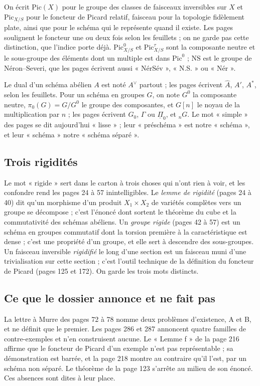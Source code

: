 \documentclass[11pt,a4paper]{article}
\begin{document}
On écrit $\mathrm{Pic}(X)$ pour le groupe des classes de faisceaux inversibles
sur $X$ et $\mathrm{Pic}_{X/S}$ pour le foncteur de Picard relatif, faisceau
pour la topologie fidèlement plate, ainsi que pour le schéma qui le représente
quand il existe. Les pages soulignent le foncteur une ou deux fois selon les
feuillets ; on ne garde pas cette distinction, que l'indice porte déjà.
$\mathrm{Pic}^0_{X/S}$ et $\mathrm{Pic}^\tau_{X/S}$ sont la composante neutre
et le sous-groupe des éléments dont un multiple est dans $\mathrm{Pic}^0$ ;
$\mathrm{NS}$ est le groupe de Néron--Severi, que les pages écrivent aussi
« NérSév », « N.S. » ou « Nér ».

Le dual d'un schéma abélien $A$ est noté $A^\vee$ partout ; les pages écrivent
$\hat{A}$, $A'$, $A^*$, selon les feuillets. Pour un schéma en groupes $G$, on
note $G^0$ la composante neutre, $\pi_0(G) = G/G^0$ le groupe des composantes,
et $G[n]$ le noyau de la multiplication par $n$ ; les pages écrivent $G_0$,
$\Gamma$ ou $\underline{\Pi}_0$, et ${}_nG$. Le mot « simple » des pages se dit
aujourd'hui « lisse » ; leur « préschéma » est notre « schéma », et leur
« schéma » notre « schéma séparé ».

\subsection*{Trois rigidités}

Le mot « rigide » sert dans le carton à trois choses qui n'ont rien à voir, et
les confondre rend les pages 24 à 57 inintelligibles. Le \emph{lemme de
rigidité} (pages 24 à 40) dit qu'un morphisme d'un produit $X_1 \times X_2$ de
variétés complètes vers un groupe se décompose ; c'est l'énoncé dont sortent le
théorème du cube et la commutativité des schémas abéliens. Un \emph{groupe
rigide} (pages 42 à 57) est un schéma en groupes commutatif dont la torsion
première à la caractéristique est dense ; c'est une propriété d'un groupe, et
elle sert à descendre des sous-groupes. Un faisceau inversible
\emph{rigidifié} le long d'une section est un faisceau muni d'une
trivialisation sur cette section ; c'est l'outil technique de la définition du
foncteur de Picard (pages 125 et 172). On garde les trois mots distincts.

\subsection*{Ce que le dossier annonce et ne fait pas}

La lettre à Murre des pages 72 à 78 nomme deux problèmes d'existence, A et B,
et ne définit que le premier. Les pages 286 et 287 annoncent quatre familles de
contre-exemples et n'en construisent aucune. Le « Lemme f » de la page 216
affirme que le foncteur de Picard d'un exemple n'est pas représentable ; sa
démonstration est barrée, et la page 218 montre au contraire qu'il l'est, par
un schéma non séparé. Le théorème de la page 123 s'arrête au milieu de son
énoncé. Ces absences sont dites à leur place.
\end{document}
